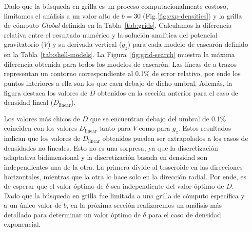 Dado que la búsqueda en grilla es un proceso computacionalmente costoso,
limitamos el análisis a un valor alto de $b=30$ (Fig.\ref{fig:exp-densities})
y la grilla de cómputo \emph{Global} definida en la Tabla~\ref{tab:grids}.
Calculamos la diferencia relativa entre el resultado numérico y la solución
analítica del potencial gravitatorio ($V$) y su derivada vertical ($g_z$) para
cada modelo de cascarón definido en la Tabla~\ref{tab:shell-models}.
La Figura~\ref{fig:grid-search} muestra la máxima diferencia obtenida para
todos los modelos de cascarón.
Las líneas de a trazos representan un contorno correspondiente al 0.1\% de
error relativo, por ende los puntos interiores a ella son los que caen debajo
de dicho umbral.
Además, la figura destaca los valores de $D$ obtenidos en la sección anterior
para el caso de densidad lineal ($D_\text{linear}$).

Los valores más chicos de $D$ que se encuentran debajo del umbral de 0.1\%
coinciden con los valores $D_\text{linear}$ tanto para $V$ como para $g_z$.
Estos resultados indican que los valores de $D_\text{linear}$ obtenidos pueden
ser extrapolados a los casos de densidades no lineales.
Esto no es una sorpresa, ya que la discretización adaptativa bidimensional y la
discretización basada en densidad son independientes una de la otra.
La primera divide al tesseroide en las direcciones horizontales, mientras que
la otra lo hace solo en la dirección radial.
Por ende, es de esperar que el valor óptimo de $\delta$ sea independiente del
valor óptimo de $D$.
Dado que la búsqueda en grilla fue limitada a una grilla de cómputo específica
y a un único valor de $b$, en la próxima sección realizaremos un análisis más
detallado para determinar un valor óptimo de $\delta$ para el caso de densidad
exponencial.

